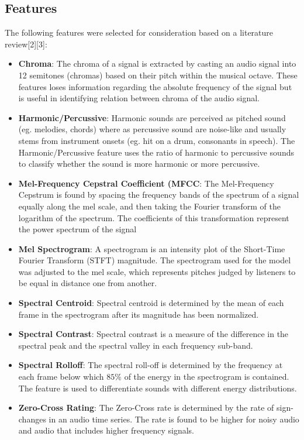 \documentclass{article}
\begin{document}
\subsection{Features}
The following features were selected for consideration based on a literature review[2][3]:
\begin{itemize}
    \item \textbf{Chroma}: The chroma of a signal is extracted by casting an audio signal into 12 semitones (chromas) based on their pitch within the musical octave. These features loses information regarding the absolute frequency of the signal but is useful in identifying relation between chroma of the audio signal.
    \item \textbf{Harmonic/Percussive}: Harmonic sounds are perceived as pitched sound (eg. melodies, chords) where as percussive sound are noise-like and usually stems from instrument onsets (eg. hit on a drum, consonants in speech). The Harmonic/Percussive feature uses the ratio of harmonic to percussive sounds to classify whether the sound is more harmonic or more percussive.
    \item \textbf{Mel-Frequency Cepstral Coefficient (MFCC}: The Mel-Frequency Cepstrum is found by spacing the frequency bands of the spectrum of a signal equally along the mel scale, and then taking the Fourier transform of the logarithm of the spectrum. The coefficients of this transformation represent the power spectrum of the signal
    \item \textbf{Mel Spectrogram}: A spectrogram is an intensity plot of the Short-Time Fourier Transform (STFT) magnitude. The spectrogram used for the model was adjusted to the mel scale, which represents pitches judged by listeners to be equal in distance one from another.
    \item \textbf{Spectral Centroid}: Spectral centroid is determined by the mean of each frame in the spectrogram after its magnitude has been normalized.
    \item \textbf{Spectral Contrast}: Spectral contrast is a measure of the difference in the spectral peak and the spectral valley in each frequency sub-band.
    \item \textbf{Spectral Rolloff}: The spectral roll-off is determined by the frequency at each frame below which ${85}\%$  of the energy in the spectrogram is contained. The feature is used to differentiate sounds with different energy distributions.
    \item \textbf{Zero-Cross Rating}: The Zero-Cross rate is determined by the rate of sign-changes in an audio time series. The rate is found to be higher for noisy audio and audio that includes higher frequency signals.
\end{itemize}
\end{document}
